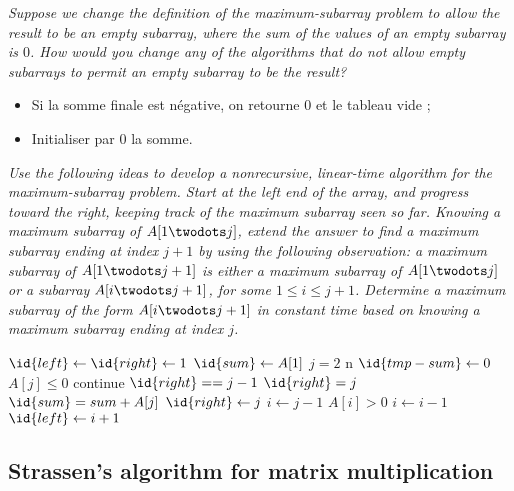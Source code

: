 \begin{description}
   {\itshape Suppose we change the definition of the maximum-subarray problem to allow the result to be an empty subarray, where the sum of the values of an empty subarray is $0$. How would you change any of the algorithms that do not allow empty subarrays to permit an empty subarray to be the result?}

    \begin{ex} %
      \begin{itemize}
        \item Si la somme finale est n\'egative, on retourne $0$ et le tableau vide ;
        \item Initialiser par $0$ la somme.
      \end{itemize}
    \end{ex}

   {\itshape Use the following ideas to develop a nonrecursive, linear-time algorithm for the maximum-subarray problem. Start at the left end of the array, and progress toward the right, keeping track of the maximum subarray seen so far. Knowing a maximum subarray of $A[1 \twodots j]$, extend the answer to find a maximum subarray ending at index $j+1$ by using the following observation: a maximum subarray of $A[1 \twodots j + 1]$ is either a maximum subarray of $A[1 \twodots j]$ or a subarray $A[i \twodots j + 1]$, for some $1 \le i \le j + 1$. Determine a maximum subarray of the form $A[i \twodots j + 1]$ in constant time based on knowing a maximum subarray ending at index $j$.}

    \begin{ex} %
      \begin{codebox}
        \li $\id{left} \gets \id{right} \gets 1$
        \li $\id{sum} \gets A[1]$
        \li \For $j = 2$ \To n \Do
        \li $\id{tmp-sum} \gets 0$
        \li \If $A[j] \le 0$ \Then
        \li continue
        \li \Else \If $\id{right} == j - 1$
        \li $\id{right} = j$
        \li $\id{sum} = sum + A[j]$
        \li \Else
        \li $\id{right} \gets j$
        \li $i \gets j - 1$
        \li \While $A[i] > 0$ \Then
        \li $i \gets i - 1$
        \li $\id{left} \gets i + 1$ \End \End \End
        \li \Return {}
      \end{codebox}
    \end{ex}

\end{description}

\subsection{Strassen’s algorithm for matrix multiplication}

